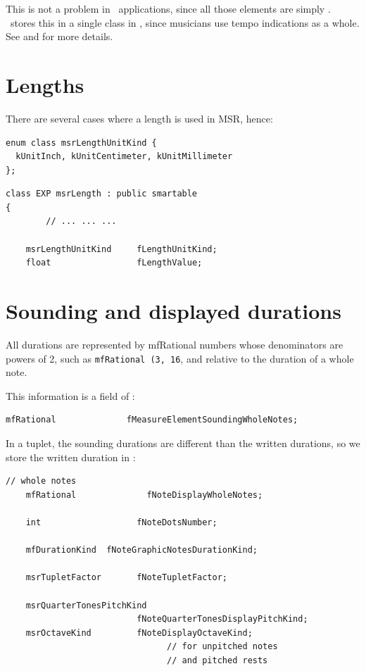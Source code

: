 This is not a problem in \GUI\ applications, since all those elements are simply \drawn. \msrRepr\ stores this in a single  class   in , since musicians use tempo indications as a whole.
See  and  for more details.


\section{Lengths}\label{Lengths}

There are several cases where a length is used in MSR, hence:
\begin{lstlisting}[language=CPlusPlus]
enum class msrLengthUnitKind {
  kUnitInch, kUnitCentimeter, kUnitMillimeter
};
\end{lstlisting}

\begin{lstlisting}[language=CPlusPlus]
class EXP msrLength : public smartable
{
		// ... ... ...

    msrLengthUnitKind     fLengthUnitKind;
    float                 fLengthValue;
\end{lstlisting}


\section{Sounding and displayed durations}\label{Sounding and displayed durations}

All durations are represented by mfRational numbers whose denominators are powers of 2, such as {\tt mfRational (3, 16}, and relative to the duration of a whole note.

This information is a field of :
\begin{lstlisting}[language=CPlusPlus]
    mfRational              fMeasureElementSoundingWholeNotes;
\end{lstlisting}

In a tuplet, the sounding durations are different than the written durations, so we store the written duration in :

\begin{lstlisting}[language=CPlusPlus]
    // whole notes
    mfRational              fNoteDisplayWholeNotes;

    int                   fNoteDotsNumber;

    mfDurationKind  fNoteGraphicNotesDurationKind;

    msrTupletFactor       fNoteTupletFactor;

    msrQuarterTonesPitchKind
                          fNoteQuarterTonesDisplayPitchKind;
    msrOctaveKind         fNoteDisplayOctaveKind;
                                // for unpitched notes
                                // and pitched rests
\end{lstlisting}

